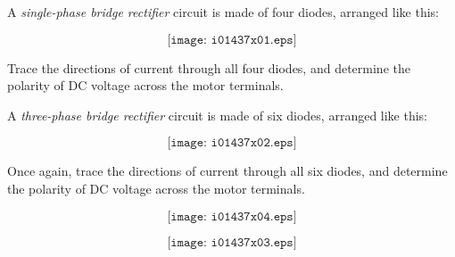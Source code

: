 

A {\it single-phase bridge rectifier} circuit is made of four diodes, arranged like this:

$$\texttt{[image: i01437x01.eps]}$$

Trace the directions of current through all four diodes, and determine the polarity of DC voltage across the motor terminals.

\vskip 10pt

A {\it three-phase bridge rectifier} circuit is made of six diodes, arranged like this:

$$\texttt{[image: i01437x02.eps]}$$

Once again, trace the directions of current through all six diodes, and determine the polarity of DC voltage across the motor terminals.







$$\texttt{[image: i01437x04.eps]}$$

$$\texttt{[image: i01437x03.eps]}$$
 









